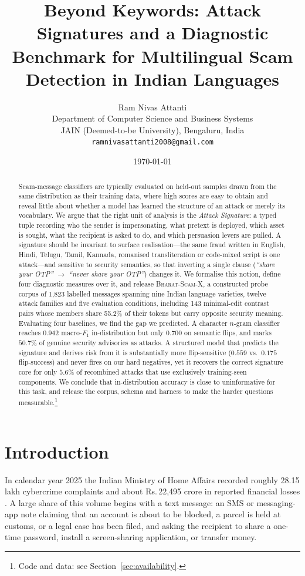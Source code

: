 \documentclass[11pt,a4paper]{article}
\title{\bfseries Beyond Keywords: Attack Signatures and a Diagnostic\\
Benchmark for Multilingual Scam Detection in Indian Languages}
\author{%
  Ram Nivas Attanti\\[2pt]
  \normalsize Department of Computer Science and Business Systems\\
  \normalsize JAIN (Deemed-to-be University), Bengaluru, India\\
  \normalsize \texttt{ramnivasattanti2008@gmail.com}
}
\date{\today}
\providecommand{\rupee}{\textrm{Rs.}}
\newcommand{\bsx}{\textsc{Bharat-Scam-X}}
\begin{document}
\maketitle

\begin{abstract}
\noindent
Scam-message classifiers are typically evaluated on held-out samples drawn from
the same distribution as their training data, where high scores are easy to
obtain and reveal little about whether a model has learned the structure of an
attack or merely its vocabulary. We argue that the right unit of analysis is the
\emph{Attack Signature}: a typed tuple recording who the sender is impersonating,
what pretext is deployed, which asset is sought, what the recipient is asked to
do, and which persuasion levers are pulled. A signature should be invariant to
surface realisation---the same fraud written in English, Hindi, Telugu, Tamil,
Kannada, romanised transliteration or code-mixed script is one attack---and
sensitive to security semantics, so that inverting a single clause
(\emph{``share your OTP''} $\rightarrow$ \emph{``never share your OTP''})
changes it.
We formalise this notion, define four diagnostic measures over it, and release
\bsx, a constructed probe corpus of 1{,}823 labelled messages spanning nine
Indian language varieties, twelve attack families and five evaluation
conditions, including 143 minimal-edit contrast pairs whose members share
55.2\% of their tokens but carry opposite security meaning.
Evaluating four baselines, we find the gap we predicted. A character $n$-gram
classifier reaches $0.942$ macro-$F_1$ in-distribution but only $0.700$ on
semantic flips, and marks $50.7\%$ of genuine security advisories as attacks.
A structured model that predicts the signature and derives risk from it is
substantially more flip-sensitive ($0.559$ vs.\ $0.175$ flip-success) and never
fires on our hard negatives, yet it recovers the correct signature core for only
$5.6\%$ of recombined attacks that use exclusively training-seen components.
We conclude that in-distribution accuracy is close to uninformative for this
task, and release the corpus, schema and harness to make the harder questions
measurable.\footnote{Code and data: see Section~\ref{sec:availability}.}
\end{abstract}

\section{Introduction}

In calendar year 2025 the Indian Ministry of Home Affairs recorded roughly
28.15 lakh cybercrime complaints and about \mbox{\rupee\,22{,}495} crore in
reported financial losses \cite{mha2026}. A large share of this volume begins
with a text message: an SMS or messaging-app note claiming that an account is
about to be blocked, a parcel is held at customs, or a legal case has been filed,
and asking the recipient to share a one-time password, install a screen-sharing
application, or transfer money.
\end{document}

